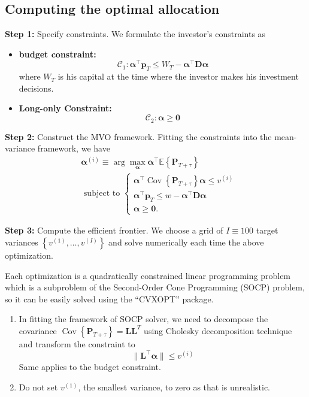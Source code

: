 \documentclass[13pt]{article}
\theoremstyle{definition}
\theoremstyle{remark}
\newenvironment{remark}
  {\pushQED{\qed}\renewcommand{\qedsymbol}{$\triangle$}\remarkx}
  {\popQED\endremarkx}
\begin{document}
\subsection{Computing the optimal allocation}
{\color{C6}\textbf{Step 1:} Specify constraints.} We formulate the investor's constraints as
\begin{itemize}
    \item \textbf{budget constraint:}$$
\mathcal{C}_1: \boldsymbol{\alpha}^{\top} \mathbf{p}_T \leq W_T-\boldsymbol{\alpha}^{\top} \mathbf{D}\boldsymbol{\alpha}
$$where $W_T$ is his capital at the time where the investor makes his investment decisions.
\item \textbf{Long-only Constraint:}$$
\mathcal{C}_2: \boldsymbol{\alpha} \geq \mathbf{0}
$$
\end{itemize}

{\color{C6}\textbf{Step 2:} Construct the MVO framework.} Fitting the constraints into the mean-variance framework, we have 
$$
\begin{aligned}
& \boldsymbol{\alpha}^{(i)} \equiv \arg\max_{\bm{\alpha}}\boldsymbol{\alpha}^{\top} \mathbb{E}\left\{\mathbf{P}_{T+\tau}\right\} \\
& \text { subject to }\left\{\begin{array}{l}
\boldsymbol{\alpha}^{\top} \operatorname{Cov}\left\{\mathbf{P}_{T+\tau}\right\} \boldsymbol{\alpha} \leq v^{(i)} \\
\boldsymbol{\alpha}^{\top} \mathbf{p}_T \leq w-\boldsymbol{\alpha}^{\top} \mathbf{D} \boldsymbol{\alpha} \\
\boldsymbol{\alpha} \geq \mathbf{0} .
\end{array}\right.
\end{aligned}
$$

{\color{C6}\textbf{Step 3:} Compute the efficient frontier.} 
We choose a grid of $I \equiv 100$ target variances $\left\{v^{(1)}, \ldots, v^{(I)}\right\}$ and solve numerically each time the above optimization. 

Each optimization is a quadratically constrained linear programming problem which is a subproblem of the Second-Order Cone Programming (SOCP) problem, so it can be easily solved using the ``CVXOPT'' package. 
\begin{remark}\hfill
    \begin{enumerate}
        \item In fitting the framework of SOCP solver, we need to decompose the covariance $\operatorname{Cov}\left\{\mathbf{P}_{T+\tau}\right\}=\mathbf{L}\mathbf{L}^T$ using Cholesky decomposition technique and transform the constraint to 
    \[
    \|\mathbf{L}^\top \boldsymbol{\alpha}\|\le v^{(i)}
    \]
    Same applies to the budget constraint.
    \item Do not set $v^{(1)}$, the smallest variance, to zero as that is unrealistic.
    \end{enumerate}
\end{remark}
\end{document}
